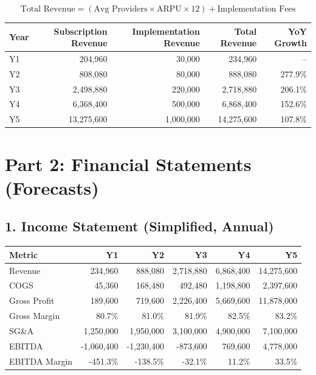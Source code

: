 \documentclass[11pt]{article}
\begin{document}
\[
\text{Total Revenue} = (\text{Avg Providers}\times\text{ARPU}\times12) + \text{Implementation Fees}
\]

\begin{center}
\begin{tabular}{lrrrr}
\toprule
\textbf{Year} & \textbf{Subscription Revenue} & \textbf{Implementation Revenue} & \textbf{Total Revenue} & \textbf{YoY Growth} \\
\midrule
Y1 & 204,960 & 30,000 & 234,960 & -- \\
Y2 & 808,080 & 80,000 & 888,080 & 277.9\% \\
Y3 & 2,498,880 & 220,000 & 2,718,880 & 206.1\% \\
Y4 & 6,368,400 & 500,000 & 6,868,400 & 152.6\% \\
Y5 & 13,275,600 & 1,000,000 & 14,275,600 & 107.8\% \\
\bottomrule
\end{tabular}
\end{center}

\section*{Part 2: Financial Statements (Forecasts)}
\subsection*{1. Income Statement (Simplified, Annual)}
\begin{center}
\begin{tabular}{lrrrrr}
\toprule
\textbf{Metric} & \textbf{Y1} & \textbf{Y2} & \textbf{Y3} & \textbf{Y4} & \textbf{Y5} \\
\midrule
Revenue & 234,960 & 888,080 & 2,718,880 & 6,868,400 & 14,275,600 \\
COGS & 45,360 & 168,480 & 492,480 & 1,198,800 & 2,397,600 \\
Gross Profit & 189,600 & 719,600 & 2,226,400 & 5,669,600 & 11,878,000 \\
Gross Margin & 80.7\% & 81.0\% & 81.9\% & 82.5\% & 83.2\% \\
SG\&A & 1,250,000 & 1,950,000 & 3,100,000 & 4,900,000 & 7,100,000 \\
EBITDA & -1,060,400 & -1,230,400 & -873,600 & 769,600 & 4,778,000 \\
EBITDA Margin & -451.3\% & -138.5\% & -32.1\% & 11.2\% & 33.5\% \\
\bottomrule
\end{tabular}
\end{center}
\end{document}
